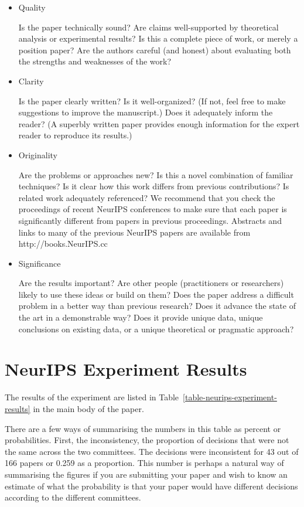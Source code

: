 \begin{itemize}
\item
  Quality

  Is the paper technically sound? Are claims well-supported by
  theoretical analysis or experimental results? Is this a complete piece
  of work, or merely a position paper? Are the authors careful (and
  honest) about evaluating both the strengths and weaknesses of the
  work?
\item
  Clarity

  Is the paper clearly written? Is it well-organized? (If not, feel free
  to make suggestions to improve the manuscript.) Does it adequately
  inform the reader? (A superbly written paper provides enough
  information for the expert reader to reproduce its results.)
\item
  Originality

  Are the problems or approaches new? Is this a novel combination of
  familiar techniques? Is it clear how this work differs from previous
  contributions? Is related work adequately referenced? We recommend
  that you check the proceedings of recent NeurIPS conferences to make sure
  that each paper is significantly different from papers in previous
  proceedings. Abstracts and links to many of the previous NeurIPS papers
  are available from http://books.NeurIPS.cc
\item
  Significance
  
  Are the results important? Are other people (practitioners or
  researchers) likely to use these ideas or build on them? Does the paper
  address a difficult problem in a better way than previous research? Does
  it advance the state of the art in a demonstrable way? Does it provide
  unique data, unique conclusions on existing data, or a unique
  theoretical or pragmatic approach?
\end{itemize}


\section{NeurIPS Experiment Results}
\label{app:neurips-experiment-results}

The results of the experiment are listed in Table~\ref{table-neurips-experiment-results} in the main body of the paper.

There are a few ways of summarising the numbers in this table as percent
or probabilities. First, the inconsistency, the proportion of decisions
that were not the same across the two committees. The decisions were
inconsistent for 43 out of 166 papers or 0.259 as a proportion. This
number is perhaps a natural way of summarising the figures if you are
submitting your paper and wish to know an estimate of what the
probability is that your paper would have different decisions according
to the different committees. 

